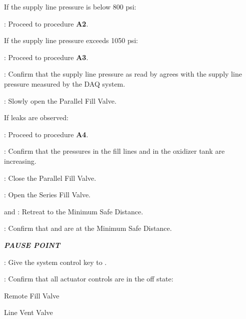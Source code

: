 \begin{checklist}
    \begin{checklist}[label=$\bullet$]
        \item If the supply line pressure is below 800 psi:
        \begin{checklist}
            \item \ops{}: Proceed to procedure \textbf{A2}.
        \end{checklist}
        \item If the supply line pressure exceeds 1050 psi:
        \begin{checklist}
            \item \ops{}: Proceed to procedure \textbf{A3}.
        \end{checklist}
    \end{checklist}
    \item \control: Confirm that the supply line pressure as read by \primary{} agrees with the supply line pressure measured by the DAQ system.
    \item \primary: Slowly open the Parallel Fill Valve.
    \begin{checklist}[label=$\bullet$]
        \item If leaks are observed:
        \begin{checklist}
            \item \ops{}: Proceed to procedure \textbf{A4}.
        \end{checklist}
    \end{checklist}
    \item \control: Confirm that the pressures in the fill lines and in the oxidizer tank are increasing.
    \item \primary: Close the Parallel Fill Valve.
    \item \primary: Open the Series Fill Valve.
    \item \primary{} and \secondary {}: Retreat to the Minimum Safe Distance.
    \item \secondary{}: Confirm that \primary{} and \secondary{} are at the Minimum Safe Distance.
    \item \textbf{\textit{PAUSE POINT}}
    \item \ops: Give the system control key to \control{}.
    \item \control: Confirm that all actuator controls are in the off state:
    \begin{checklist}
        \item Remote Fill Valve
        \item Line Vent Valve

\end{checklist}
\end{checklist}
